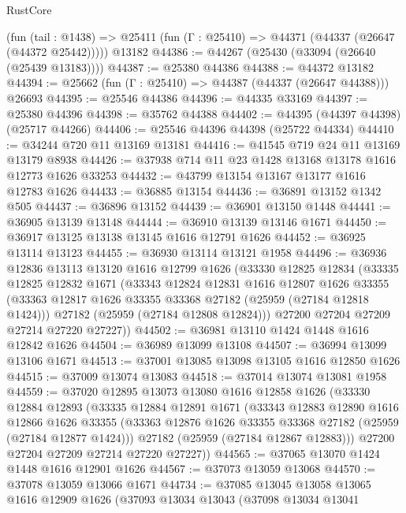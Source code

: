 \begin{lexlean}{RustCore}
\begin{coremodule}
    (fun (tail : @1438) => @25411 (fun (Γ : @25410) => @44371 (@44337 (@26647 (@44372 @25442)))))
    @13182
@44386 := @44267 (@25430 (@33094 (@26640 (@25439 @13183))))
@44387 := @25380 @44386
@44388 := @44372 @13182
@44394 := @25662 (fun (Γ : @25410) => @44387 (@44337 (@26647 @44388))) @26693
@44395 := @25546 @44386
@44396 := @44335 @33169
@44397 := @25380 @44396
@44398 := @35762 @44388
@44402 := @44395 (@44397 @44398) (@25717 @44266)
@44406 := @25546 @44396 @44398 (@25722 @44334)
@44410 := @34244 @720 @11 @13169 @13181
@44416 := @41545 @719 @24 @11 @13169 @13179 @8938
@44426 := @37938 @714 @11 @23 @1428 @13168 @13178 @1616 @12773 @1626 @33253
@44432 := @43799 @13154 @13167 @13177 @1616 @12783 @1626
@44433 := @36885 @13154
@44436 := @36891 @13152 @1342 @505
@44437 := @36896 @13152
@44439 := @36901 @13150 @1448
@44441 := @36905 @13139 @13148
@44444 := @36910 @13139 @13146 @1671
@44450 := @36917 @13125 @13138 @13145 @1616 @12791 @1626
@44452 := @36925 @13114 @13123
@44455 := @36930 @13114 @13121 @1958
@44496 := @36936
    @12836
    @13113
    @13120
    @1616
    @12799
    @1626
    (@33330
      @12825
      @12834
      (@33335
        @12825
        @12832
        @1671
        (@33343
          @12824
          @12831
          @1616
          @12807
          @1626
          @33355
          (@33363 @12817 @1626 @33355 @33368 @27182 (@25959 (@27184 @12818 @1424)))
          @27182
          (@25959 (@27184 @12808 @12824)))
        @27200
        @27204
        @27209
        @27214
        @27220
        @27227))
@44502 := @36981 @13110 @1424 @1448 @1616 @12842 @1626
@44504 := @36989 @13099 @13108
@44507 := @36994 @13099 @13106 @1671
@44513 := @37001 @13085 @13098 @13105 @1616 @12850 @1626
@44515 := @37009 @13074 @13083
@44518 := @37014 @13074 @13081 @1958
@44559 := @37020
    @12895
    @13073
    @13080
    @1616
    @12858
    @1626
    (@33330
      @12884
      @12893
      (@33335
        @12884
        @12891
        @1671
        (@33343
          @12883
          @12890
          @1616
          @12866
          @1626
          @33355
          (@33363 @12876 @1626 @33355 @33368 @27182 (@25959 (@27184 @12877 @1424)))
          @27182
          (@25959 (@27184 @12867 @12883)))
        @27200
        @27204
        @27209
        @27214
        @27220
        @27227))
@44565 := @37065 @13070 @1424 @1448 @1616 @12901 @1626
@44567 := @37073 @13059 @13068
@44570 := @37078 @13059 @13066 @1671
@44734 := @37085
    @13045
    @13058
    @13065
    @1616
    @12909
    @1626
    (@37093
      @13034
      @13043
      (@37098
        @13034
        @13041

\end{coremodule}
\end{lexlean}
